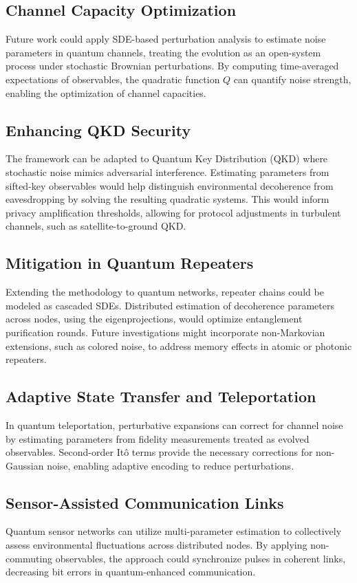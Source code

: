 \documentclass[journal,twocolumn]{IEEEtran}
\begin{document}
\subsection{Channel Capacity Optimization}
Future work could apply SDE-based perturbation analysis to estimate noise parameters in quantum channels, treating the evolution as an open-system process under stochastic Brownian perturbations. By computing time-averaged expectations of observables, the quadratic function $Q$ can quantify noise strength, enabling the optimization of channel capacities.

\subsection{Enhancing QKD Security}
The framework can be adapted to Quantum Key Distribution (QKD) where stochastic noise mimics adversarial interference. Estimating parameters from sifted-key observables would help distinguish environmental decoherence from eavesdropping by solving the resulting quadratic systems. This would inform privacy amplification thresholds, allowing for protocol adjustments in turbulent channels, such as satellite-to-ground QKD.

\subsection{Mitigation in Quantum Repeaters}
Extending the methodology to quantum networks, repeater chains could be modeled as cascaded SDEs. Distributed estimation of decoherence parameters across nodes, using the eigenprojections, would optimize entanglement purification rounds. Future investigations might incorporate non-Markovian extensions, such as colored noise, to address memory effects in atomic or photonic repeaters.

\subsection{Adaptive State Transfer and Teleportation}
In quantum teleportation, perturbative expansions can correct for channel noise by estimating parameters from fidelity measurements treated as evolved observables. Second-order It\^{o} terms provide the necessary corrections for non-Gaussian noise, enabling adaptive encoding to reduce perturbations.

\subsection{Sensor-Assisted Communication Links}
Quantum sensor networks can utilize multi-parameter estimation to collectively assess environmental fluctuations across distributed nodes. By applying non-commuting observables, the approach could synchronize pulses in coherent links, decreasing bit errors in quantum-enhanced communication.
\end{document}
